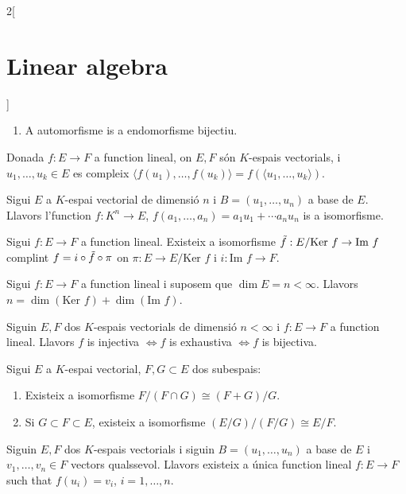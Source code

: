 \documentclass[../../../main.tex]{subfiles}
\begin{document}
\begin{multicols}{2}[\section{Linear algebra}]
\begin{definition}
\begin{enumerate}
    \item A automorfisme is a endomorfisme bijectiu.
\end{enumerate}
\end{definition}
\begin{lemma}
Donada $f:E\rightarrow F$ a function lineal, on $E,F$ són $K$-espais vectorials, i $u_1,\ldots,u_k\in E$ es compleix $\langle f(u_1),\ldots,f(u_k)\rangle=f(\langle u_1,\ldots,u_k\rangle)$.
\end{lemma}
\begin{theorem}
Sigui $E$ a $K$-espai vectorial  de dimensió $n$ i $B=(u_1,\ldots,u_n)$ a base de $E$. Llavors l'function $f:K^n\rightarrow E$, $f(a_1,\ldots,a_n)=a_1u_1+\cdots a_nu_n$ is a isomorfisme.
\end{theorem}
\begin{theorem}
Sigui $f:E\rightarrow F$ a function lineal. Existeix a isomorfisme $\Tilde{f}:E/\text{Ker }f\rightarrow \text{Im }f$ complint $f=i\circ\Tilde{f}\circ\pi$ on $\pi:E\rightarrow E/\text{Ker }f$ i $i:\text{Im }f\rightarrow F$.
\end{theorem}
\begin{corollary}
Sigui $f:E\rightarrow F$ a function lineal i suposem que $\dim E=n<\infty$. Llavors $n=\dim(\text{Ker }f)+\dim(\text{Im }f)$.
\end{corollary}
\begin{corollary}
Siguin $E,F$ dos $K$-espais vectorials de dimensió $n<\infty$ i $f:E\rightarrow F$ a function lineal. Llavors $f$ is injectiva $\iff f$ is exhaustiva $\iff f$ is bijectiva.
\end{corollary}
\begin{theorem}
Sigui $E$ a $K$-espai vectorial, $F,G\subset E$ dos subespais:
\begin{enumerate}
    \item Existeix a isomorfisme $F/(F\cap G)\cong(F+G)/G$.
    \item Si $G\subset F\subset E$, existeix a isomorfisme $(E/G)/(F/G)\cong E/F$.
\end{enumerate}
\end{theorem}
\begin{theorem}
Siguin $E,F$ dos $K$-espais vectorials i siguin $B=(u_1,\ldots,u_n)$ a base de $E$ i $v_1,\ldots,v_n\in F$ vectors qualssevol. Llavors existeix a única function lineal $f:E\rightarrow F$ such that $f(u_i)=v_i$, $i=1,\ldots,n$. 
\end{theorem}

\end{multicols}
\end{document}
